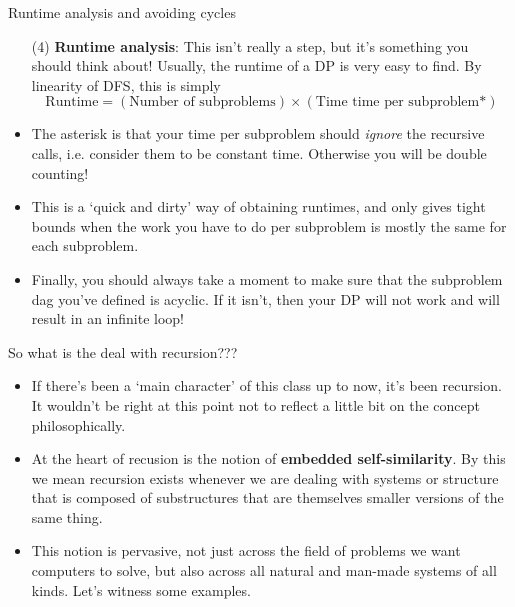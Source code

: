\documentclass{beamer}
\begin{document}
\begin{frame}{Runtime analysis and avoiding cycles}
    \begin{itemize}
        \item[(4)] \textbf{Runtime analysis}: This isn't really a step, but it's something you should think about! Usually, the runtime of a DP is very easy to find. By linearity of DFS, this is simply
        \[ \textrm{Runtime} = (\textrm{Number of subproblems})\times (\textrm{Time time per subproblem*}) \]
        \item The asterisk is that your time per subproblem should \emph{ignore} the recursive calls, i.e. consider them to be constant time. Otherwise you will be double counting! 
        \item This is a `quick and dirty' way of obtaining runtimes, and only gives tight bounds when the work you have to do per subproblem is mostly the same for each subproblem.
        \item Finally, you should always take a moment to make sure that the subproblem dag you've defined is acyclic. If it isn't, then your DP will not work and will result in an infinite loop!
    \end{itemize}
\end{frame}

\begin{frame}{So what is the deal with recursion???}
    \begin{itemize}
        \item If there's been a `main character' of this class up to now, it's been recursion. It wouldn't be right at this point not to reflect a little bit on the concept philosophically. \pause 
        \item At the heart of recusion is the notion of \textbf{embedded self-similarity}. By this we mean recursion exists whenever we are dealing with systems or structure that is composed of substructures that are themselves smaller versions of the same thing. \pause
        \item This notion is pervasive, not just across the field of problems we want computers to solve, but also across all natural and man-made systems of all kinds. Let's witness some examples.
    \end{itemize}
\end{frame}
\end{document}
